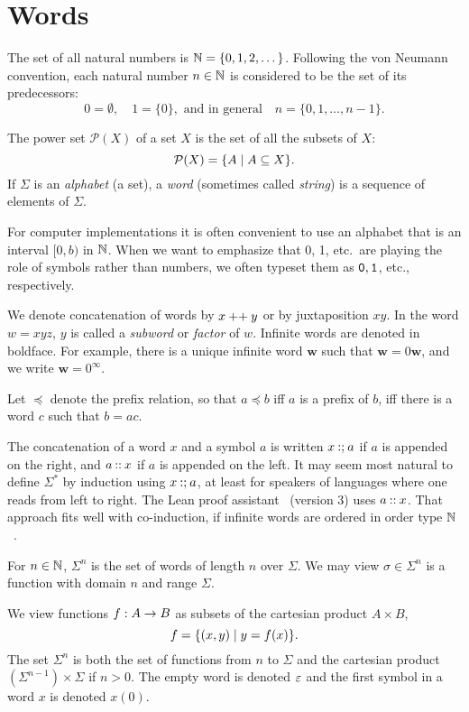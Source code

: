 \section{Words}

	The set of all natural numbers is $\mathbb{N}=\{0,1,2,\dots\}$.
	Following the von Neumann convention, each natural number $n\in\mathbb{N}$ is considered to be the set of its predecessors:
	\[
		0=\emptyset,\quad 1=\{0\}, \text{ and in general}\quad n=\{0,1,\dots,n-1\}.
	\]


	The power set $\mathcal P(X)$ of a set $X$ is the set of all the subsets of $X$:
	\[
		\mathcal P(X) = \{A \mid A \subseteq X\}.
	\]
	If $\Sigma$ is an \emph{alphabet} (a set), a \emph{word} (sometimes called \emph{string}) is a sequence of elements of $\Sigma$.

	For computer implementations it is often convenient to use an alphabet that is an interval $[0,b)$ in $\mathbb{N}$.
	When we want to emphasize that 0, 1, etc.~are playing the role of symbols rather than numbers, we often typeset them as $\mathtt{0}, \mathtt{1}$, etc., respectively.

	We denote concatenation of words by $x\mathbin{{+}{+}} y$ or by juxtaposition $xy$.
	In the word $w=xyz$, $y$ is called a \emph{subword} or \emph{factor} of $w$. Infinite words are denoted in boldface.
	For example, there is a unique infinite word $\mathbf{w}$ such that $\mathbf w = 0 \mathbf w$, and we write $\mathbf w = 0^{\infty}$.

	Let $\preceq$ denote the prefix relation, so that $a\preceq b$ iff $a$ is a prefix of $b$,
	iff there is a word $c$ such that $b=ac$.


	The concatenation of a word $x$ and a symbol $a$ is written $x\mathbin{{:}{;}} a$ if $a$ is appended on the right, and
	$a\mathbin{{:}{:}} x$ if $a$ is appended on the left. It may seem most natural to define $\Sigma^*$ by induction
	using $x\mathbin{{:}{;}} a$, at least for speakers of languages where one reads from left to right.
	The Lean proof assistant~\cite{conf/cade/MouraKADR15} (version 3) uses $a \mathbin{{:}{:}} x$.
	That approach fits well with co-induction, if infinite words are ordered in order type $\mathbb{N}$~\cite{MR3705668}.

	For $n\in\mathbb{N}$, $\Sigma^n$ is the set of words of length $n$ over $\Sigma$.
	We may view $\sigma\in\Sigma^n$ is a function with domain $n$ and range $\Sigma$.

	We view functions $f: A\to B$ as subsets of the cartesian product $A\times B$,
	\[
		f=\{(x,y)\mid y=f(x)\}.
	\]
	The set $\Sigma^n$ is both the set of functions from $n$ to $\Sigma$ and
	the cartesian product $(\Sigma^{n-1})\times\Sigma$ if $n>0$.
	The empty word is denoted $\varepsilon$ and the first symbol in a word $x$ is denoted $x(0)$.

